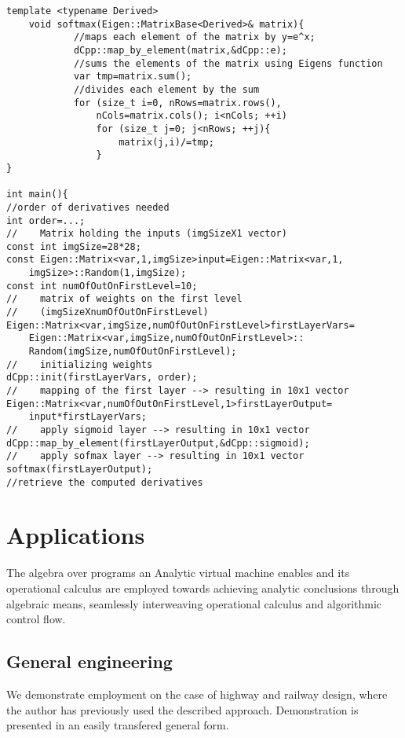 \documentclass{article}
\begin{document}
\begin{lstlisting}
template <typename Derived>
    void softmax(Eigen::MatrixBase<Derived>& matrix){
            //maps each element of the matrix by y=e^x;
            dCpp::map_by_element(matrix,&dCpp::e);
            //sums the elements of the matrix using Eigens function
            var tmp=matrix.sum();
            //divides each element by the sum
            for (size_t i=0, nRows=matrix.rows(), 
            	nCols=matrix.cols(); i<nCols; ++i)
                for (size_t j=0; j<nRows; ++j){
                    matrix(j,i)/=tmp;
                }
}

int main(){
//order of derivatives needed
int order=...;
//    Matrix holding the inputs (imgSizeX1 vector)
const int imgSize=28*28;
const Eigen::Matrix<var,1,imgSize>input=Eigen::Matrix<var,1,
	imgSize>::Random(1,imgSize);
const int numOfOutOnFirstLevel=10;
//    matrix of weights on the first level 
//    (imgSizeXnumOfOutOnFirstLevel)
Eigen::Matrix<var,imgSize,numOfOutOnFirstLevel>firstLayerVars=
	Eigen::Matrix<var,imgSize,numOfOutOnFirstLevel>::
	Random(imgSize,numOfOutOnFirstLevel);
//    initializing weights
dCpp::init(firstLayerVars, order);
//    mapping of the first layer --> resulting in 10x1 vector
Eigen::Matrix<var,numOfOutOnFirstLevel,1>firstLayerOutput=
	input*firstLayerVars;
//    apply sigmoid layer --> resulting in 10x1 vector
dCpp::map_by_element(firstLayerOutput,&dCpp::sigmoid);
//    apply sofmax layer --> resulting in 10x1 vector
softmax(firstLayerOutput);
//retrieve the computed derivatives
\end{lstlisting}

\section{Applications}\label{sec:Employment}

The algebra over programs \cite[Theorem~14]{OperationalCalculus} an Analytic virtual machine enables and its operational calculus are employed towards achieving analytic conclusions through algebraic means, seamlessly interweaving operational calculus and algorithmic control flow. 

\subsection{General engineering}\label{sec:generalEngineering}

We demonstrate employment on the case of highway and railway design, where the author has previously used the described approach. Demonstration is presented in an easily transfered general form.
\end{document}
